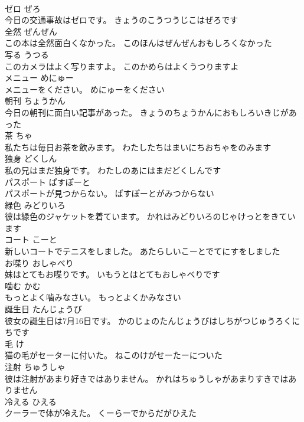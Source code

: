 \documentclass[8pt]{extreport}
\begin{document}
\begin{CJK}{UTF8}{min}
\\	ゼロ	ぜろ	
\\	今日の交通事故はゼロです。	きょうのこうつうじこはぜろです	
\\	全然	ぜんぜん	
\\	この本は全然面白くなかった。	このほんはぜんぜんおもしろくなかった	
\\	写る	うつる	
\\	このカメラはよく写りますよ。	このかめらはよくうつりますよ	
\\	メニュー	めにゅー	
\\	メニューをください。	めにゅーをください	
\\	朝刊	ちょうかん	
\\	今日の朝刊に面白い記事があった。	きょうのちょうかんにおもしろいきじがあった	
\\	茶	ちゃ	
\\	私たちは毎日お茶を飲みます。	わたしたちはまいにちおちゃをのみます	
\\	独身	どくしん	
\\	私の兄はまだ独身です。	わたしのあにはまだどくしんです	
\\	パスポート	ぱすぽーと	
\\	パスポートが見つからない。	ぱすぽーとがみつからない	
\\	緑色	みどりいろ	
\\	彼は緑色のジャケットを着ています。	かれはみどりいろのじゃけっとをきています	
\\	コート	こーと	
\\	新しいコートでテニスをしました。	あたらしいこーとでてにすをしました	
\\	お喋り	おしゃべり	
\\	妹はとてもお喋りです。	いもうとはとてもおしゃべりです	
\\	噛む	かむ	
\\	もっとよく噛みなさい。	もっとよくかみなさい	
\\	誕生日	たんじょうび	
\\	彼女の誕生日は7月16日です。	かのじょのたんじょうびはしちがつじゅうろくにちです	
\\	毛	け	
\\	猫の毛がセーターに付いた。	ねこのけがせーたーについた	
\\	注射	ちゅうしゃ	
\\	彼は注射があまり好きではありません。	かれはちゅうしゃがあまりすきではありません	
\\	冷える	ひえる	
\\	クーラーで体が冷えた。	くーらーでからだがひえた	

\end{CJK}
\end{document}
